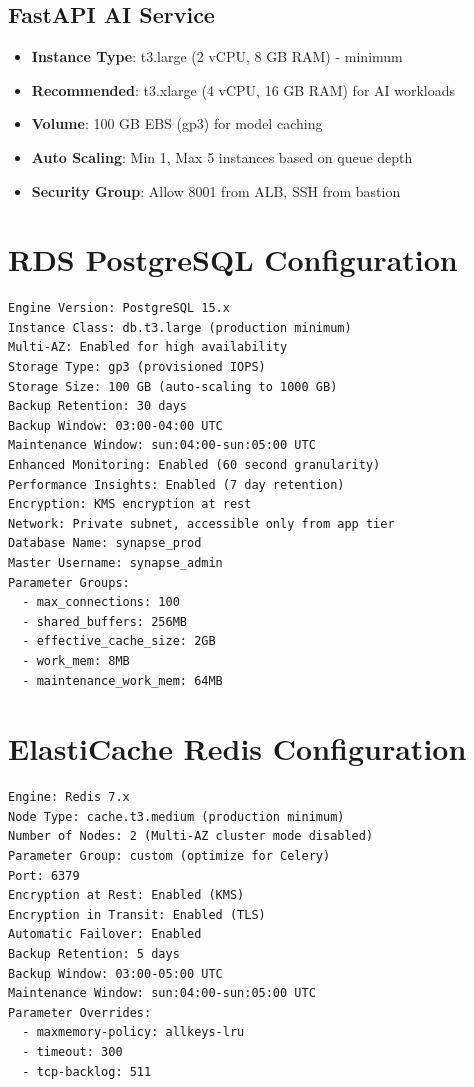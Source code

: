 \documentclass{report}
\begin{document}
\subsection{FastAPI AI Service}

\begin{itemize}
  \item \textbf{Instance Type}: t3.large (2 vCPU, 8 GB RAM) - minimum
  \item \textbf{Recommended}: t3.xlarge (4 vCPU, 16 GB RAM) for AI workloads
  \item \textbf{Volume}: 100 GB EBS (gp3) for model caching
  \item \textbf{Auto Scaling}: Min 1, Max 5 instances based on queue depth
  \item \textbf{Security Group}: Allow 8001 from ALB, SSH from bastion
\end{itemize}

\section{RDS PostgreSQL Configuration}

\begin{lstlisting}[caption=RDS PostgreSQL Setup Parameters]
Engine Version: PostgreSQL 15.x
Instance Class: db.t3.large (production minimum)
Multi-AZ: Enabled for high availability
Storage Type: gp3 (provisioned IOPS)
Storage Size: 100 GB (auto-scaling to 1000 GB)
Backup Retention: 30 days
Backup Window: 03:00-04:00 UTC
Maintenance Window: sun:04:00-sun:05:00 UTC
Enhanced Monitoring: Enabled (60 second granularity)
Performance Insights: Enabled (7 day retention)
Encryption: KMS encryption at rest
Network: Private subnet, accessible only from app tier
Database Name: synapse_prod
Master Username: synapse_admin
Parameter Groups:
  - max_connections: 100
  - shared_buffers: 256MB
  - effective_cache_size: 2GB
  - work_mem: 8MB
  - maintenance_work_mem: 64MB
\end{lstlisting}

\section{ElastiCache Redis Configuration}

\begin{lstlisting}[caption=ElastiCache Redis Setup Parameters]
Engine: Redis 7.x
Node Type: cache.t3.medium (production minimum)
Number of Nodes: 2 (Multi-AZ cluster mode disabled)
Parameter Group: custom (optimize for Celery)
Port: 6379
Encryption at Rest: Enabled (KMS)
Encryption in Transit: Enabled (TLS)
Automatic Failover: Enabled
Backup Retention: 5 days
Backup Window: 03:00-05:00 UTC
Maintenance Window: sun:04:00-sun:05:00 UTC
Parameter Overrides:
  - maxmemory-policy: allkeys-lru
  - timeout: 300
  - tcp-backlog: 511
\end{lstlisting}
\end{document}
